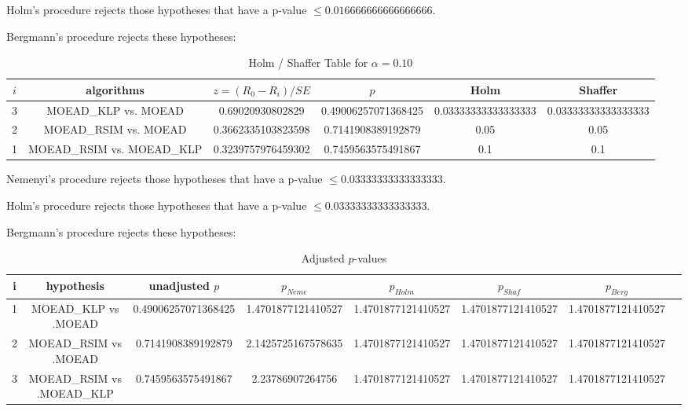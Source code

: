 \documentclass[a4paper,10pt]{article}
\begin{document}
\begin{landscape}
Holm's procedure rejects those hypotheses that have a p-value $\le0.016666666666666666$.


Bergmann's procedure rejects these hypotheses:


\begin{itemize}


\end{itemize}


\begin{table}[!htp]
\centering\tiny
\caption{Holm / Shaffer Table for $\alpha=0.10$}
\begin{tabular}{cccccc}
$i$&algorithms&$z=(R_0 - R_i)/SE$&$p$&Holm&Shaffer\\
\hline
3&MOEAD_KLP vs. MOEAD&0.69020930802829&0.49006257071368425&0.03333333333333333&0.03333333333333333\\
2&MOEAD_RSIM vs. MOEAD&0.3662335103823598&0.7141908389192879&0.05&0.05\\
1&MOEAD_RSIM vs. MOEAD_KLP&0.3239757976459302&0.7459563575491867&0.1&0.1\\
\hline
\end{tabular}
\end{table}
Nemenyi's procedure rejects those hypotheses that have a p-value $\le0.03333333333333333$.


Holm's procedure rejects those hypotheses that have a p-value $\le0.03333333333333333$.


Bergmann's procedure rejects these hypotheses:


\begin{itemize}


\end{itemize}


\begin{table}[!htp]
\centering\tiny
\caption{Adjusted $p$-values}
\begin{tabular}{cccccccc}
i&hypothesis&unadjusted $p$&$p_{Neme}$&$p_{Holm}$&$p_{Shaf}$&$p_{Berg}$\\
\hline
1&MOEAD_KLP vs .MOEAD&0.49006257071368425&1.4701877121410527&1.4701877121410527&1.4701877121410527&1.4701877121410527\\
2&MOEAD_RSIM vs .MOEAD&0.7141908389192879&2.1425725167578635&1.4701877121410527&1.4701877121410527&1.4701877121410527\\
3&MOEAD_RSIM vs .MOEAD_KLP&0.7459563575491867&2.23786907264756&1.4701877121410527&1.4701877121410527&1.4701877121410527\\
\hline
\end{tabular}
\end{table}

\end{landscape}
\end{document}
